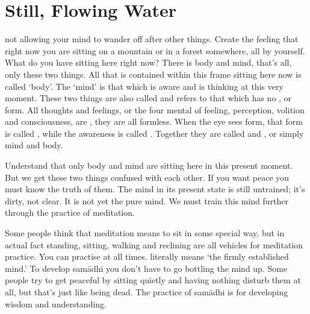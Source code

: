 
\chapter{Still, Flowing Water}

 not allowing your mind to wander off after other things. Create the feeling that right now you are sitting on a mountain or in a forest somewhere, all by yourself. What do you have sitting here right now? There is body and mind, that's all, only these two things. All that is contained within this frame sitting here now is called `body'. The `mind' is that which is aware and is thinking at this very moment. These two things are also called  and   refers to that which has no , or form. All thoughts and feelings, or the four mental  of feeling, perception, volition and consciousness, are , they are all formless. When the eye sees form, that form is called , while the awareness is called . Together they are called  and , or simply mind and body.

Understand that only body and mind are sitting here in this present moment. But we get these two things confused with each other. If you want peace you must know the truth of them. The mind in its present state is still untrained; it's dirty, not clear. It is not yet the pure mind. We must train this mind further through the practice of meditation.

Some people think that meditation means to sit in some special way, but in actual fact standing, sitting, walking and reclining are all vehicles for meditation practice. You can practise at all times.  literally means `the firmly established mind.' To develop sam\=adhi you don't have to go bottling the mind up. Some people try to get peaceful by sitting quietly and having nothing disturb them at all, but that's just like being dead. The practice of sam\=adhi is for developing wisdom and understanding.


